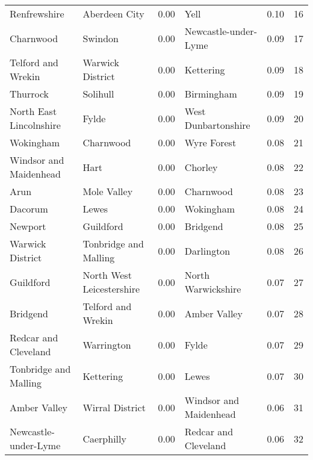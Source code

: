 \begin{tabular}{llrlrr}
Renfrewshire              &              Aberdeen City &  0.00 &                       Yell &    0.10 &    16 \\
Charnwood                 &                    Swindon &  0.00 &       Newcastle-under-Lyme &    0.09 &    17 \\
Telford and Wrekin        &           Warwick District &  0.00 &                  Kettering &    0.09 &    18 \\
Thurrock                  &                   Solihull &  0.00 &                 Birmingham &    0.09 &    19 \\
North East Lincolnshire   &                      Fylde &  0.00 &        West Dunbartonshire &    0.09 &    20 \\
Wokingham                 &                  Charnwood &  0.00 &                Wyre Forest &    0.08 &    21 \\
Windsor and Maidenhead    &                       Hart &  0.00 &                    Chorley &    0.08 &    22 \\
Arun                      &                Mole Valley &  0.00 &                  Charnwood &    0.08 &    23 \\
Dacorum                   &                      Lewes &  0.00 &                  Wokingham &    0.08 &    24 \\
Newport                   &                  Guildford &  0.00 &                   Bridgend &    0.08 &    25 \\
Warwick District          &      Tonbridge and Malling &  0.00 &                 Darlington &    0.08 &    26 \\
Guildford                 &  North West Leicestershire &  0.00 &         North Warwickshire &    0.07 &    27 \\
Bridgend                  &         Telford and Wrekin &  0.00 &               Amber Valley &    0.07 &    28 \\
Redcar and Cleveland      &                 Warrington &  0.00 &                      Fylde &    0.07 &    29 \\
Tonbridge and Malling     &                  Kettering &  0.00 &                      Lewes &    0.07 &    30 \\
Amber Valley              &            Wirral District &  0.00 &     Windsor and Maidenhead &    0.06 &    31 \\
Newcastle-under-Lyme      &                 Caerphilly &  0.00 &       Redcar and Cleveland &    0.06 &    32 \\

\end{tabular}
